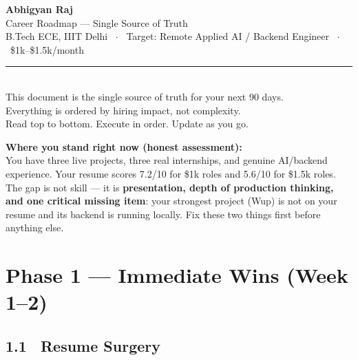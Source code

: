 \documentclass[11pt, a4paper]{article}
\DeclareRobustCommand{\badge}[2]{%
  \tikz[baseline=(n.base)]{
    \node[inner sep=3pt, rounded corners=3pt,
          fill=#1!15, text=#1!70!black,
          font=\fontsize{8}{8}\selectfont\bfseries] (n) {#2};
  }%
}
\DeclareRobustCommand{\critical}{\badge{danger}{CRITICAL}}
\begin{document}

\begin{center}
  {\fontsize{26}{30}\selectfont\bfseries\color{primary} Abhigyan Raj}\\[6pt]
  {\large\color{muted} Career Roadmap — Single Source of Truth}\\[4pt]
  {\small\color{muted} B.Tech ECE, IIIT Delhi \ $\cdot$ \ Target: Remote Applied AI / Backend Engineer \ $\cdot$ \ \$1k--\$1.5k/month}\\[10pt]
  \textcolor{border}{\rule{0.6\linewidth}{0.4pt}}\\[6pt]
  {\small\color{muted}
    This document is the single source of truth for your next 90 days.\\
    Everything is ordered by hiring impact, not complexity.\\
    Read top to bottom. Execute in order. Update as you go.
  }
\end{center}

\vspace{16pt}

\begin{infobox}
\textbf{\color{primary}Where you stand right now (honest assessment):}\\[4pt]
You have three live projects, three real internships, and genuine AI/backend experience. Your resume scores 7.2/10 for \$1k roles and 5.6/10 for \$1.5k roles. The gap is not skill — it is \textbf{presentation, depth of production thinking, and one critical missing item}: your strongest project (Wup) is not on your resume and its backend is running locally. Fix these two things first before anything else.
\end{infobox}

\vspace{8pt}

\section{Phase 1 — Immediate Wins (Week 1–2)}

\subsection{1.1 \ Resume Surgery \hfill \critical}
\end{document}
